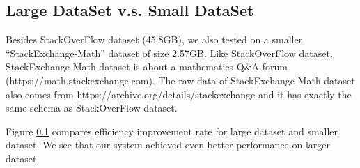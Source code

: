 \subsection{Large DataSet v.s. Small DataSet}
Besides StackOverFlow dataset (45.8GB), we also tested on a smaller ``StackExchange-Math'' dataset of size 2.57GB. Like StackOverFlow dataset, StackExchange-Math dataset is about a mathematics Q\&A forum (https://math.stackexchange.com).  The raw data of StackExchange-Math dataset also comes from https://archive.org/details/stackexchange and it has exactly the same schema as StackOverFlow dataset. 

Figure \ref{} compares efficiency improvement rate for large dataset and smaller dataset. We see that our system achieved even better performance on larger dataset. 


